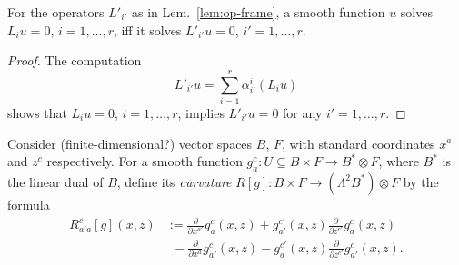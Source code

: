 \begin{lemma} \label{lem:eq-frame-equiv}
For the operators $L'_{i'}$ as in Lem.~\ref{lem:op-frame}, a smooth function $u$
solves $L_i u = 0$, $i=1,\ldots,r$, iff it solves $L'_{i'} u = 0$,
$i'=1,\ldots,r$.
\end{lemma}
\begin{proof}
The computation
\[
  L'_{i'} u = \sum_{i=1}^r \alpha_{i'}^i (L_i u)
\]
shows that $L_i u = 0$, $i=1,\ldots,r$, implies $L'_{i'} u = 0$ for any $i'=1,\ldots,r$.
\end{proof}

\begin{definition}[curvature] \label{def:curvature}
Consider (finite-dimensional?) vector spaces $B$, $F$, with standard coordinates
$x^a$ and $z^c$ respectively. For a smooth function $g_a^c\colon U\subseteq B
\times F \to B^* \otimes F$, where $B^*$ is the linear dual of $B$, define its
\emph{curvature} $R[g] \colon B \times F \to (\Lambda^2 B^*) \otimes F$ by the
formula
\begin{equation} \label{eq:curvature-def}
\begin{aligned}
  R_{a'a}^c[g](x,z)
  &:= \frac{\partial}{\partial x^{a'}} g^c_a(x,z)
    + g^{c'}_{a'}(x,z) \frac{\partial}{\partial z^{c'}} g^c_a(x,z) \\
  & ~~{} - \frac{\partial}{\partial x^{a}} g^c_{a'}(x,z)
    - g^{c'}_{a}(x,z) \frac{\partial}{\partial z^{c'}} g^c_{a'}(x,z) .
\end{aligned}
\end{equation}
\end{definition}

